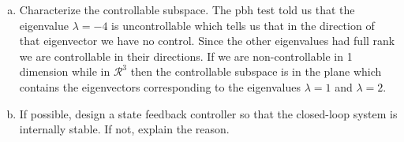 \documentclass{article}
\begin{document}
\begin{enumerate}[(a)]
\item Characterize the controllable subspace.
\newline
\newline
The pbh test told us that the eigenvalue $\lambda = -4$ is uncontrollable which tells us that in the direction of that eigenvector we have no control.
Since the other eigenvalues had full rank we are controllable in their directions.
If we are non-controllable in 1 dimension while in $\mathcal{R}^3$ then the controllable subspace is in the plane which contains the eigenvectors corresponding to the eigenvalues $\lambda = 1$ and $\lambda = 2$.

\item If possible, design a state feedback controller so that the closed-loop system is internally stable.
If not, explain the reason.
\newline
\newline

\end{enumerate}
\end{document}
